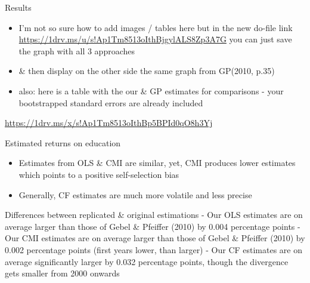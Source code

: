 \documentclass[10pt,ignorenonframetext,]{beamer}
\providecommand{\tightlist}{%
  \setlength{\itemsep}{0pt}\setlength{\parskip}{0pt}}
\begin{document}
\begin{frame}{Results}
\protect\hypertarget{results}{}

\begin{itemize}
\item
  I'm not so sure how to add images / tables here but in the new do-file
  link \url{https://1drv.ms/u/s!Ap1Tm8513oIthBjgylALS8Zp3A7G} you can
  just save the graph with all 3 approaches
\item
  \& then display on the other side the same graph from GP(2010, p.35)
\item
  also: here is a table with the our \& GP estimates for comparisons -
  your bootstrapped standard errors are already included
\end{itemize}

\url{https://1drv.ms/x/s!Ap1Tm8513oIthBp5BPId0qO8h3Yj}

\end{frame}

\begin{frame}{Estimated returns on education}
\protect\hypertarget{estimated-returns-on-education}{}

\begin{itemize}
\tightlist
\item
  Estimates from OLS \& CMI are similar, yet, CMI produces lower
  estimates which points to a positive self-selection bias
\item
  Generally, CF estimates are much more volatile and less precise
\end{itemize}

Differences between replicated \& original estimations - Our OLS
estimates are on average larger than those of Gebel \& Pfeiffer (2010)
by 0.004 percentage points - Our CMI estimates are on average larger
than those of Gebel \& Pfeiffer (2010) by 0.002 percentage points (first
years lower, than larger) - Our CF estimates are on average
significantly larger by 0.032 percentage points, though the divergence
gets smaller from 2000 onwards

\end{frame}
\end{document}
